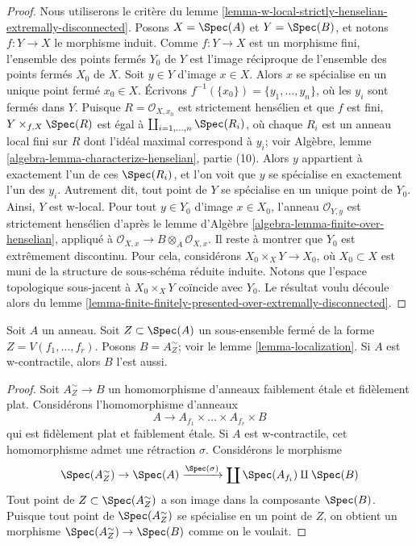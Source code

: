 \begin{proof}
Nous utiliserons le critère du
lemme \ref{lemma-w-local-strictly-henselian-extremally-disconnected}.
Posons $X = \Spec(A)$ et $Y = \Spec(B)$, et notons $f : Y \to X$
le morphisme induit.
Comme $f : Y \to X$ est un morphisme fini, l'ensemble des points fermés
$Y_0$ de $Y$ est l'image réciproque de l'ensemble des points fermés
$X_0$ de $X$. Soit $y \in Y$ d'image $x \in X$. Alors
$x$ se spécialise en un unique point fermé $x_0 \in X$.
Écrivons $f^{-1}(\{x_0\}) = \{y_1, \ldots, y_n\}$, où les $y_i$
sont fermés dans $Y$. Puisque $R = \mathcal{O}_{X, x_0}$ est strictement hensélien
et que $f$ est fini, $Y \times_{f, X} \Spec(R)$ est
égal à $\coprod_{i = 1, \ldots, n} \Spec(R_i)$, où
chaque $R_i$ est un anneau local fini sur $R$
dont l'idéal maximal correspond à $y_i$; voir
Algèbre, lemme \ref{algebra-lemma-characterize-henselian}, partie (10).
Alors $y$ appartient à exactement l'un de ces $\Spec(R_i)$,
et l'on voit que $y$ se spécialise en exactement l'un des $y_i$.
Autrement dit, tout point de $Y$ se spécialise en un unique
point de $Y_0$. Ainsi, $Y$ est w-local.
Pour tout $y \in Y_0$ d'image $x \in X_0$,
l'anneau $\mathcal{O}_{Y, y}$ est strictement hensélien d'après le
lemme d'Algèbre \ref{algebra-lemma-finite-over-henselian},
appliqué à $\mathcal{O}_{X, x} \to B \otimes_A \mathcal{O}_{X, x}$.
Il reste à montrer que $Y_0$ est extrêmement discontinu.
Pour cela, considérons $X_0 \times_X Y \to X_0$,
où $X_0 \subset X$ est muni de la structure de sous-schéma réduite induite.
Notons que l'espace topologique sous-jacent à
$X_0 \times_X Y$ coïncide avec $Y_0$. Le résultat voulu découle alors du
lemme \ref{lemma-finite-finitely-presented-over-extremally-disconnected}.
\end{proof}

\begin{lemma}
\label{lemma-localization-w-contractible}
Soit $A$ un anneau. Soit $Z \subset \Spec(A)$ un sous-ensemble fermé
de la forme $Z = V(f_1, \ldots, f_r)$. Posons $B = A_Z^\sim$; voir le
lemme \ref{lemma-localization}. Si $A$ est w-contractile, alors $B$ l'est aussi.
\end{lemma}

\begin{proof}
Soit $A_Z^\sim \to B$ un homomorphisme d'anneaux faiblement \'etale et fidèlement plat.
Considérons l'homomorphisme d'anneaux
$$
A \longrightarrow A_{f_1} \times \ldots \times A_{f_r} \times B
$$
qui est fidèlement plat et faiblement \'etale. Si $A$ est w-contractile,
cet homomorphisme admet une rétraction $\sigma$. Considérons le morphisme
$$
\Spec(A_Z^\sim) \to \Spec(A) \xrightarrow{\Spec(\sigma)}
\coprod \Spec(A_{f_i}) \amalg \Spec(B)
$$
Tout point de $Z \subset \Spec(A_Z^\sim)$ a son image dans la composante
$\Spec(B)$. Puisque tout point de $\Spec(A_Z^\sim)$ se spécialise en un
point de $Z$, on obtient un morphisme $\Spec(A_Z^\sim) \to \Spec(B)$
comme on le voulait.
\end{proof}






